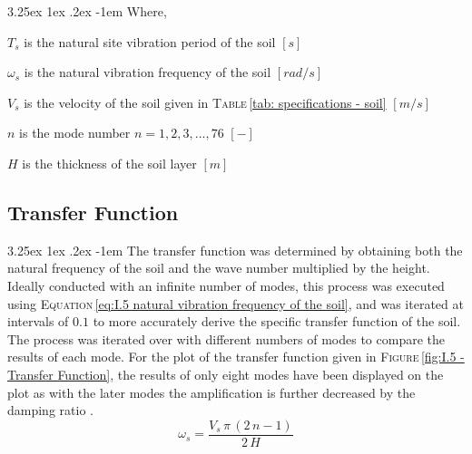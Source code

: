 \documentclass[11pt,a4paper,titlepage]{report}
\makeatletter
\renewcommand\paragraph{\@startsection{paragraph}{5}{\z@}%
  {3.25ex \@plus1ex \@minus.2ex}%
  {-1em}%
  {\normalfont\normalsize\bfseries}}
\makeatother
\begin{document}
\paragraph{}Where,
\begin{itemize}
\begin{small}
    \item $T_s$ is the natural site vibration period of the soil $[s]$
    \item $\omega_s$ is the natural vibration frequency of the soil $[rad/s]$
    \item $V_s$ is the velocity of the soil given in \textsc{Table}\,\ref{tab: specifications - soil} $[m/s]$
    \item $n$ is the mode number $n=1,2,3,...,76$ $[-]$
    \item $H$ is the thickness of the soil layer $[m]$
\end{small}
\end{itemize}
\subsection{Transfer Function}
\paragraph{}The transfer function was determined by obtaining both the natural frequency of the soil and the wave number multiplied by the height. Ideally conducted with an infinite number of modes, this process was executed using \textsc{Equation}\,\ref{eq:I.5 natural vibration frequency of the soil}, and was iterated at intervals of $0.1$ to more accurately derive the specific transfer function of the soil. The process was iterated over with different numbers of modes to compare the results of each mode. For the plot of the transfer function given in \textsc{Figure}\,\ref{fig:I.5 - Transfer Function}, the results of only eight modes have been displayed on the plot as with the later modes the amplification is further decreased by the damping ratio \cite{Soil}.
\begin{equation}
    \omega_s=\dfrac{V_s\,\pi\,(2\,n-1)}{2\,H}
    \label{eq:I.5 natural vibration frequency of the soil}
\end{equation}
\end{document}
